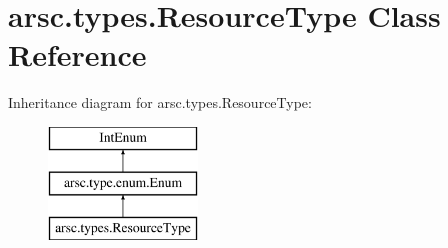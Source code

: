 \hypertarget{classarsc_1_1types_1_1ResourceType}{}\section{arsc.\+types.\+Resource\+Type Class Reference}
\label{classarsc_1_1types_1_1ResourceType}
Inheritance diagram for arsc.\+types.\+Resource\+Type\+:\begin{figure}[H]
\begin{center}
\leavevmode
\includegraphics[height=3.000000cm]{classarsc_1_1types_1_1ResourceType}
\end{center}
\end{figure}
